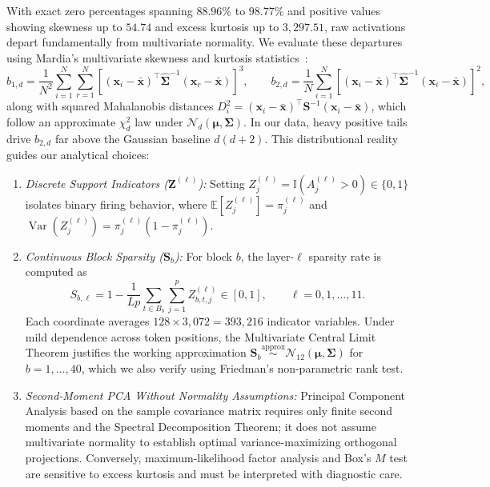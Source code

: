 \documentclass[12pt, a4paper, oneside]{report}
\theoremstyle{definition}
\newcommand{\vect}[1]{\mathbf{#1}}
\newcommand{\mat}[1]{\mathbf{#1}}
\newcommand{\E}{\mathbb{E}}
\newcommand{\Var}{\operatorname{Var}}
\newcommand{\Ind}{\mathbb{I}}
\begin{document}
With exact zero percentages spanning $88.96\%$ to $98.77\%$ and positive values showing skewness up to $54.74$ and excess kurtosis up to $3{,}297.51$, raw activations depart fundamentally from multivariate normality. We evaluate these departures using Mardia's multivariate skewness and kurtosis statistics~\cite{mardia1970measures}:
\begin{equation}
    b_{1,d} = \frac{1}{N^2}\sum_{i=1}^{N}\sum_{r=1}^{N} \left[(\vect{x}_i - \bar{\vect{x}})^\top \hat{\mat{\Sigma}}^{-1} (\vect{x}_r - \bar{\vect{x}})\right]^3,
    \qquad
    b_{2,d} = \frac{1}{N}\sum_{i=1}^{N} \left[(\vect{x}_i - \bar{\vect{x}})^\top \hat{\mat{\Sigma}}^{-1} (\vect{x}_i - \bar{\vect{x}})\right]^2,
    \label{eq:mardia}
\end{equation}
along with squared Mahalanobis distances $D_i^2 = (\vect{x}_i - \bar{\vect{x}})^\top \mat{S}^{-1} (\vect{x}_i - \bar{\vect{x}})$, which follow an approximate $\chi^2_d$ law under $\mathcal{N}_d(\boldsymbol{\mu}, \mat{\Sigma})$. In our data, heavy positive tails drive $b_{2,d}$ far above the Gaussian baseline $d(d+2)$. This distributional reality guides our analytical choices:
\begin{enumerate}
    \item \emph{Discrete Support Indicators ($\vect{Z}^{(\ell)}$):} Setting $Z_j^{(\ell)} = \Ind(A_j^{(\ell)} > 0) \in \{0, 1\}$ isolates binary firing behavior, where $\E[Z_j^{(\ell)}] = \pi_j^{(\ell)}$ and $\Var(Z_j^{(\ell)}) = \pi_j^{(\ell)}(1 - \pi_j^{(\ell)})$.
    \item \emph{Continuous Block Sparsity ($\vect{S}_b$):} For block $b$, the layer-$\ell$ sparsity rate is computed as
    \begin{equation}
        S_{b,\ell} = 1 - \frac{1}{L p}\sum_{t \in B_b}\sum_{j=1}^{p} Z_{b,t,j}^{(\ell)} \in [0, 1],
        \qquad \ell = 0, 1, \dots, 11.
        \label{eq:block_sparsity_def}
    \end{equation}
    Each coordinate averages $128 \times 3{,}072 = 393{,}216$ indicator variables. Under mild dependence across token positions, the Multivariate Central Limit Theorem justifies the working approximation $\vect{S}_b \stackrel{\text{approx}}{\sim} \mathcal{N}_{12}(\boldsymbol{\mu}, \mat{\Sigma})$ for $b = 1, \dots, 40$, which we also verify using Friedman's non-parametric rank test.
    \item \emph{Second-Moment PCA Without Normality Assumptions:} Principal Component Analysis based on the sample covariance matrix requires only finite second moments and the Spectral Decomposition Theorem; it does not assume multivariate normality to establish optimal variance-maximizing orthogonal projections. Conversely, maximum-likelihood factor analysis and Box's $M$ test are sensitive to excess kurtosis and must be interpreted with diagnostic care.
\end{enumerate}
\end{document}
